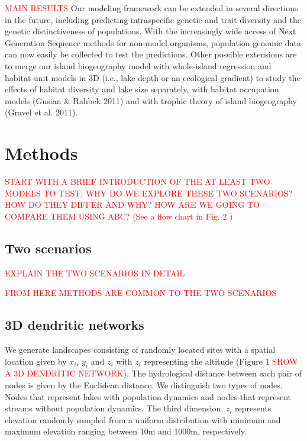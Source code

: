 \documentclass[11pt]{article}
\newcommand{\carlos}[1]{\textcolor{Red}{#1}}
\begin{document}
{\carlos{MAIN RESULTS}
Our modeling framework can be extended in several directions in the
future, including predicting intraspecific genetic and trait diversity
and the genetic distinctiveness of populations. With the increasingly
wide access of Next Generation Sequence methods for non-model
organisms, population genomic data can now easily be collected to test
the predictions. Other possible extensions are to merge our island
biogeography model with whole-island regression and habitat-unit
models in 3D (i.e., lake depth or an ecological gradient) to study the
effects of habitat diversity and lake size separately, with habitat
occupation models (Gusian & Rahbek 2011) and with trophic theory of
island biogeography (Gravel et al. 2011).

\section{Methods}

 \carlos{START WITH A BRIEF INTRODUCTION OF THE AT LEAST TWO MODELS TO TEST: WHY DO WE EXPLORE THESE TWO SCENARIOS? HOW DO THEY DIFFER AND WHY? HOW ARE WE GOING TO COMPARE THEM USING ABC? (See a flow chart in Fig. 2 )}

\subsection{Two scenarios}

 \carlos{EXPLAIN THE TWO SCENARIOS IN DETAIL}

\carlos{FROM HERE METHODS ARE COMMON TO THE TWO SCENARIOS}

\subsection{3D dendritic networks}

We generate landscapes consisting of randomly located sites with a
spatial location given by $x_{i}$, $y_{i}$ and $z_{i}$ with $z_{i}$
representing the altitude (Figure 1 \carlos{SHOW A 3D DENDRITIC NETWORK}). The
hydrological distance between each pair of nodes is given by the
Euclidean distance. We distinguish two types of nodes. Nodes that
represent lakes with population dynamics and nodes that represent
streams without population dynamics. The third dimension, $z_{i}$
represents elevation randomly sampled from a uniform distribution with
minimum and maximum elevation ranging between 10m and 1000m,
respectively.




}
\end{document}
